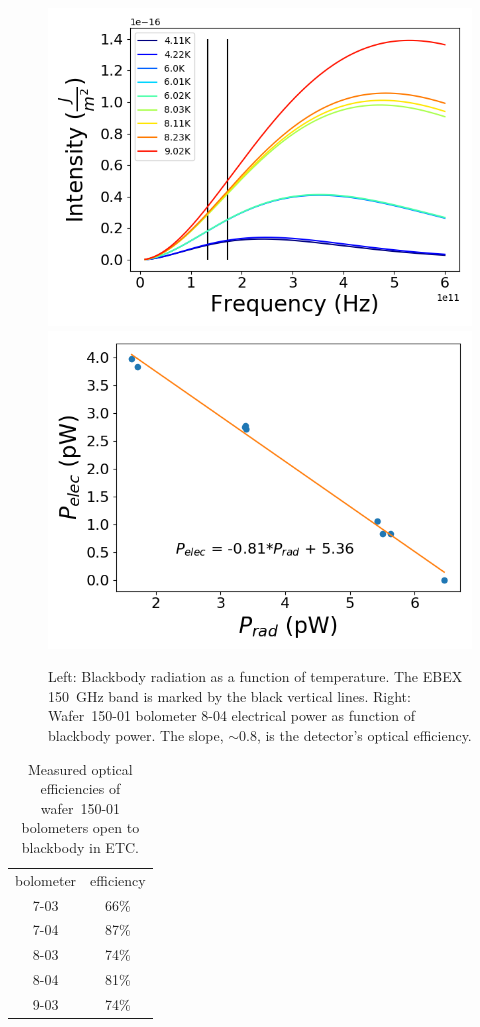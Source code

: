 \begin{figure}[htp]
\begin{center}
\includegraphics[width=0.49\columnwidth]{figures/blackbody_intensity_plot.png}
\includegraphics[width=0.48\columnwidth]{figures/SqCh2_Ch1_p_vs_p.png}
\caption{Left: Blackbody radiation as a function of temperature. The \ac{EBEX} 150~GHz band is marked by the black vertical lines. Right: Wafer~150-01 bolometer 8-04 electrical power as function of blackbody power. The slope, $\sim0.8$, is the detector's optical efficiency. 
\label{fig:pelec_vs_popt} }
\end{center}
\end{figure}

\begin{table}[htp]
\begin{center}
\begin{tabular}{|c|c|}
bolometer & efficiency \\
7-03	& 66\% \\
7-04	& 87\% \\
8-03	& 74\% \\
8-04	& 81\% \\
9-03	& 74\% \\
\end{tabular}
\end{center}
\caption{Measured optical efficiencies of wafer~150-01 bolometers open to blackbody in \ac{ETC}.
\label{tab:opt_eff} }
\end{table}



